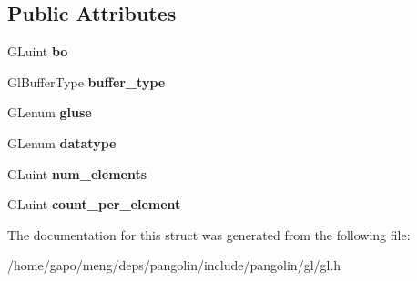 \subsection*{Public Attributes}
\begin{DoxyCompactItemize}
\item 
G\+Luint {\bfseries bo}\hypertarget{structpangolin_1_1_gl_buffer_adcae774cc3075a7427acb7e78c1dcc70}{}\label{structpangolin_1_1_gl_buffer_adcae774cc3075a7427acb7e78c1dcc70}

\item 
Gl\+Buffer\+Type {\bfseries buffer\+\_\+type}\hypertarget{structpangolin_1_1_gl_buffer_a49d82803f478868af7438a5940b309b7}{}\label{structpangolin_1_1_gl_buffer_a49d82803f478868af7438a5940b309b7}

\item 
G\+Lenum {\bfseries gluse}\hypertarget{structpangolin_1_1_gl_buffer_ae76ae84e7814c1fad5321fdc0ba7e305}{}\label{structpangolin_1_1_gl_buffer_ae76ae84e7814c1fad5321fdc0ba7e305}

\item 
G\+Lenum {\bfseries datatype}\hypertarget{structpangolin_1_1_gl_buffer_aa158b6b9111ae907d30618953f91cefb}{}\label{structpangolin_1_1_gl_buffer_aa158b6b9111ae907d30618953f91cefb}

\item 
G\+Luint {\bfseries num\+\_\+elements}\hypertarget{structpangolin_1_1_gl_buffer_adca05c7ac6309f4a8e06f58cda9fb6b1}{}\label{structpangolin_1_1_gl_buffer_adca05c7ac6309f4a8e06f58cda9fb6b1}

\item 
G\+Luint {\bfseries count\+\_\+per\+\_\+element}\hypertarget{structpangolin_1_1_gl_buffer_a4070d916da45cc9ce08d853dee9cbf7f}{}\label{structpangolin_1_1_gl_buffer_a4070d916da45cc9ce08d853dee9cbf7f}

\end{DoxyCompactItemize}


The documentation for this struct was generated from the following file\+:\begin{DoxyCompactItemize}
\item 
/home/gapo/meng/deps/pangolin/include/pangolin/gl/gl.\+h\end{DoxyCompactItemize}
